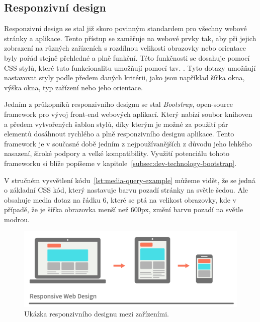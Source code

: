 \subsection{Responzivní design}
\label{subsec:ui-gui-theory-responsive-design}
Responzivní design se stal již skoro povinným standardem pro všechny webové stránky a aplikace. Tento přístup se zaměřuje na webové prvky tak, aby při jejich zobrazení na různých zařízeních s rozdílnou velikosti obrazovky nebo orientace byly pořád stejně přehledné a plně funkční. Této funkčnosti se dosahuje pomocí CSS stylů, které tuto funkcionalitu umožňují pomocí tzv. \textit{}. Tyto dotazy umožňují nastavovat styly podle předem daných kritérii, jako jsou například šířka okna, výška okna, typ zařízení nebo jeho orientace.

Jedním z průkopníků responzivního designu se stal \textit{Bootstrap}, open-source framework pro vývoj front-end webových aplikací. Který nabízí soubor knihoven a předem vytvořených šablon stylů, díky kterým je možné za použití pár elementů dosáhnout rychlého a plně responzivního designu aplikace. Tento framework je v současné době jedním z nejpoužívanějších z důvodu jeho lehkého nasazení, široké podpory a velké kompatibility. Využití potenciálu tohoto frameworku si blíže popíšeme v kapitole~\ref{subsec:dev-technology-bootstrap}.



V stručném vysvětlení kódu~\ref{lst:media-query-example} můžeme vidět, že se jedná o základní CSS kód, který nastavuje barvu pozadí stránky na světle šedou. Ale obsahuje media dotaz na řádku 6, které se ptá na velikost obrazovky, kde v případě, že je šířka obrazovka menší než 600px, změní barvu pozadí na světle modrou.

\begin{figure}[H]
    \centering
    \includegraphics[width=1.0\textwidth]{figures/responsiveDesign}
    \caption{Ukázka responzivního designu mezi zařízeními. \cite{responsive_design}}
    \label{fig:responsive-design-example}
\end{figure}

